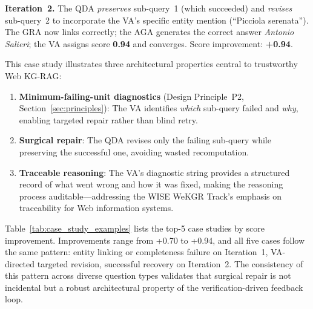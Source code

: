 \textbf{Iteration~2.} The QDA \emph{preserves} sub-query~1 (which succeeded) and
\emph{revises} sub-query~2 to incorporate the VA's specific entity mention
(``Picciola serenata''). The GRA now links correctly; the AGA generates the
correct answer \emph{Antonio Salieri}; the VA assigns score \textbf{0.94} and
converges. Score improvement: \textbf{+0.94}.

This case study illustrates three architectural properties central to trustworthy
Web KG-RAG:

\begin{enumerate}
  \item \textbf{Minimum-failing-unit diagnostics} (Design Principle~P2,
        Section~\ref{sec:principles}): The VA identifies \emph{which} sub-query
        failed and \emph{why}, enabling targeted repair rather than blind retry.

  \item \textbf{Surgical repair}: The QDA revises only the failing sub-query
        while preserving the successful one, avoiding wasted recomputation.

  \item \textbf{Traceable reasoning}: The VA's diagnostic string provides a
        structured record of what went wrong and how it was fixed, making the
        reasoning process auditable---addressing the WISE WeKGR Track's emphasis
        on traceability for Web information systems.
\end{enumerate}

Table~\ref{tab:case_study_examples} lists the top-5 case studies by score
improvement. Improvements range from +0.70 to +0.94, and all five cases follow
the same pattern: entity linking or completeness failure on Iteration~1,
VA-directed targeted revision, successful recovery on Iteration~2. The consistency
of this pattern across diverse question types validates that surgical repair is
not incidental but a robust architectural property of the verification-driven
feedback loop.

